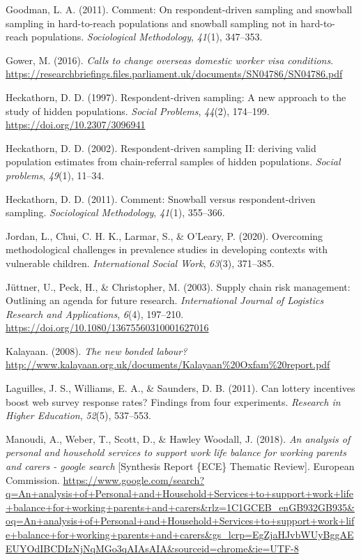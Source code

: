 \documentclass[
  12pt,
]{article}
\newlength{\cslhangindent}
\newenvironment{CSLReferences}[2] %
 {\begin{list}{}{%
  \setlength{\itemindent}{0pt}
  \setlength{\leftmargin}{0pt}
  \setlength{\parsep}{0pt}
  \ifodd #1
   \setlength{\leftmargin}{\cslhangindent}
   \setlength{\itemindent}{-1\cslhangindent}
  \fi
  \setlength{\itemsep}{#2\baselineskip}}}
 {\end{list}}
\theoremstyle{plain}
\theoremstyle{definition}
\begin{document}
\begin{CSLReferences}{1}{0}
Goodman, L. A. (2011). Comment: On respondent-driven sampling and
snowball sampling in hard-to-reach populations and snowball sampling not
in hard-to-reach populations. \emph{Sociological Methodology},
\emph{41}(1), 347--353.

Gower, M. (2016). \emph{Calls to change overseas domestic worker visa
conditions}.
\url{https://researchbriefings.files.parliament.uk/documents/SN04786/SN04786.pdf}

Heckathorn, D. D. (1997). Respondent-driven sampling: A new approach to
the study of hidden populations. \emph{Social Problems}, \emph{44}(2),
174--199. \url{https://doi.org/10.2307/3096941}

Heckathorn, D. D. (2002). Respondent-driven sampling {II}: deriving
valid population estimates from chain-referral samples of hidden
populations. \emph{Social problems}, \emph{49}(1), 11--34.

Heckathorn, D. D. (2011). Comment: Snowball versus respondent-driven
sampling. \emph{Sociological Methodology}, \emph{41}(1), 355--366.

Jordan, L., Chui, C. H. K., Larmar, S., \& O'Leary, P. (2020).
Overcoming methodological challenges in prevalence studies in developing
contexts with vulnerable children. \emph{International Social Work},
\emph{63}(3), 371--385.

Jüttner, U., Peck, H., \& Christopher, M. (2003). Supply chain risk
management: Outlining an agenda for future research. \emph{International
Journal of Logistics Research and Applications}, \emph{6}(4), 197--210.
\url{https://doi.org/10.1080/13675560310001627016}

Kalayaan. (2008). \emph{The new bonded labour?}
\url{http://www.kalayaan.org.uk/documents/Kalayaan\%20Oxfam\%20report.pdf}

Laguilles, J. S., Williams, E. A., \& Saunders, D. B. (2011). Can
lottery incentives boost web survey response rates? Findings from four
experiments. \emph{Research in Higher Education}, \emph{52}(5),
537--553.

Manoudi, A., Weber, T., Scott, D., \& Hawley Woodall, J. (2018).
\emph{An analysis of personal and household services to support work
life balance for working parents and carers - google search}
{[}Synthesis Report \{ECE\} Thematic Review{]}. European Commission.
\url{https://www.google.com/search?q=An+analysis+of+Personal+and+Household+Services+to+support+work+life+balance+for+working+parents+and+carers&rlz=1C1GCEB_enGB932GB935&oq=An+analysis+of+Personal+and+Household+Services+to+support+work+life+balance+for+working+parents+and+carers&gs_lcrp=EgZjaHJvbWUyBggAEEUYOdIBCDIzNjNqMGo3qAIAsAIA&sourceid=chrome&ie=UTF-8}


\end{CSLReferences}
\end{document}
